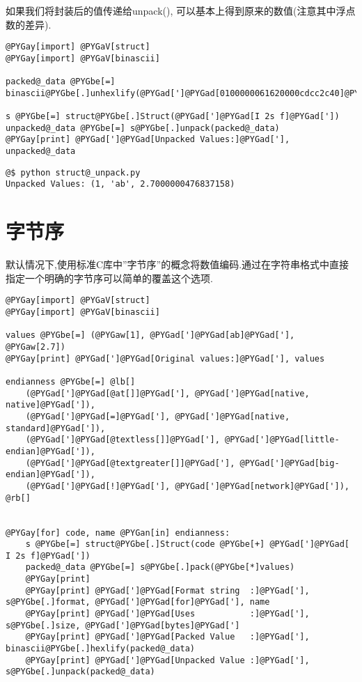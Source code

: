 \documentclass[a4paper,10pt,english]{manual}
\begin{document}
如果我们将封装后的值传递给unpack(), 可以基本上得到原来的数值(注意其中浮点数的差异).

\begin{Verbatim}[commandchars=@\[\]]
@PYGay[import] @PYGaV[struct]
@PYGay[import] @PYGaV[binascii]

packed@_data @PYGbe[=] binascii@PYGbe[.]unhexlify(@PYGad[']@PYGad[0100000061620000cdcc2c40]@PYGad['])

s @PYGbe[=] struct@PYGbe[.]Struct(@PYGad[']@PYGad[I 2s f]@PYGad['])
unpacked@_data @PYGbe[=] s@PYGbe[.]unpack(packed@_data)
@PYGay[print] @PYGad[']@PYGad[Unpacked Values:]@PYGad['], unpacked@_data
\end{Verbatim}

\begin{Verbatim}[commandchars=@\[\]]
@$ python struct@_unpack.py
Unpacked Values: (1, 'ab', 2.7000000476837158)
\end{Verbatim}


\section{字节序}

默认情况下,使用标准C库中''字节序''的概念将数值编码.通过在字符串格式中直接指定一个明确的字节序可以简单的覆盖这个选项.

\begin{Verbatim}[commandchars=@\[\]]
@PYGay[import] @PYGaV[struct]
@PYGay[import] @PYGaV[binascii]

values @PYGbe[=] (@PYGaw[1], @PYGad[']@PYGad[ab]@PYGad['], @PYGaw[2.7])
@PYGay[print] @PYGad[']@PYGad[Original values:]@PYGad['], values

endianness @PYGbe[=] @lb[]
    (@PYGad[']@PYGad[@at[]]@PYGad['], @PYGad[']@PYGad[native, native]@PYGad[']),
    (@PYGad[']@PYGad[=]@PYGad['], @PYGad[']@PYGad[native, standard]@PYGad[']),
    (@PYGad[']@PYGad[@textless[]]@PYGad['], @PYGad[']@PYGad[little-endian]@PYGad[']),
    (@PYGad[']@PYGad[@textgreater[]]@PYGad['], @PYGad[']@PYGad[big-endian]@PYGad[']),
    (@PYGad[']@PYGad[!]@PYGad['], @PYGad[']@PYGad[network]@PYGad[']),
@rb[]


@PYGay[for] code, name @PYGan[in] endianness:
    s @PYGbe[=] struct@PYGbe[.]Struct(code @PYGbe[+] @PYGad[']@PYGad[ I 2s f]@PYGad['])
    packed@_data @PYGbe[=] s@PYGbe[.]pack(@PYGbe[*]values)
    @PYGay[print]
    @PYGay[print] @PYGad[']@PYGad[Format string  :]@PYGad['], s@PYGbe[.]format, @PYGad[']@PYGad[for]@PYGad['], name
    @PYGay[print] @PYGad[']@PYGad[Uses           :]@PYGad['], s@PYGbe[.]size, @PYGad[']@PYGad[bytes]@PYGad[']
    @PYGay[print] @PYGad[']@PYGad[Packed Value   :]@PYGad['], binascii@PYGbe[.]hexlify(packed@_data)
    @PYGay[print] @PYGad[']@PYGad[Unpacked Value :]@PYGad['], s@PYGbe[.]unpack(packed@_data)
\end{Verbatim}
\end{document}
